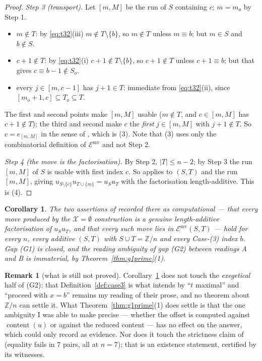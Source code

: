 \documentclass[11pt]{article}
\newtheorem{cor}[thm]{Corollary}
\theoremstyle{definition}
\newtheorem{rem}[thm]{Remark}
\newcommand{\Z}{\mathbb{Z}}
\newcommand{\XX}{\mathcal{X}}
\newcommand{\cont}{\operatorname{content}}
\begin{document}
\begin{proof}
\emph{Step 3 (transport).} Let $[m,M]$ be the run of $S$ containing $c$; $m=m_o$ by Step 1.
\begin{itemize}
\item $m\notin T$: by \eqref{eq:t32}(iii) $m\notin T\setminus\{b\}$, so $m\notin T$ unless
$m\equiv b$; but $m\in S$ and $b\notin S$.
\item $c+1\notin T$: by \eqref{eq:t32}(i) $c+1\notin T\setminus\{b\}$, so $c+1\notin T$ unless
$c+1\equiv b$; but that gives $c\equiv b-1\notin S_o$.
\item every $j\in[m,c-1]$ has $j+1\in T$: immediate from \eqref{eq:t32}(ii), since
$[m_o+1,c]\subseteq T_o\subseteq T$.
\end{itemize}
The first and second points make $[m,M]$ usable ($m\notin T$, and $c\in[m,M]$ has $c+1\notin T$);
the third and second make $c$ the \emph{first} $j\in[m,M]$ with $j+1\notin T$. So $c=e_{[m,M]}$
in the sense of \cite[Def.~1.1]{Clio3}, which is (3). Note that (3) uses only the combinatorial
definition of $\mathcal E^{\mathrm{mv}}$ and not Step 2.

\emph{Step 4 (the move is the factorisation).} By Step 2, $|T|\le n-2$; by Step 3 the run
$[m,M]$ of $S$ is usable with first index $c$. So \cite[Lem.~4.3]{Clio2} applies to $(S,T)$ and
the run $[m,M]$, giving $u_{S\setminus\{c\}}u_{T\cup\{m\}}=u_Su_T$ with the factorisation
length-additive. This is (4).
\end{proof}

\begin{cor}\label{cor:upgrade}
The two assertions of \cite[\S5]{Clio3} recorded there as computational --- that every move
produced by the $\XX=\emptyset$ construction is a genuine length-additive factorisation of
$u_Su_T$, and that every such move lies in $\mathcal E^{\mathrm{mv}}(S,T)$ --- hold for every
$n$, every additive $(S,T)$ with $S\cup T=\Z/n$ and every Case-(3) index $b$. Gap (G1) is
closed, and the reading ambiguity of gap (G2) between readings A and B is immaterial, by
Theorem~\ref{thm:g1prime}(1).
\end{cor}

\begin{rem}[what is still not proved]
Corollary~\ref{cor:upgrade} does not touch the \emph{exegetical} half of (G2): that
Definition~\ref{def:case3} is what \cite[\S\texttt{two factor case}]{MS} intends by ``$t$
maximal'' and ``proceed with $x=b$'' remains my reading of their prose, and no theorem about
$\Z/n$ can settle it. What Theorem~\ref{thm:g1prime}(1) does settle is that the one ambiguity I
was able to make precise --- whether the offset is computed against $\cont(u)$ or against the
reduced content --- has no effect on the answer, which \cite[\S Gaps, (G2)]{Clio3} could only
record as evidence. Nor does it touch the strictness claim of \cite[\S5]{Clio3} (equality fails
in $7$ pairs, all at $n=7$); that is an existence statement, certified by its witnesses.
\end{rem}
\end{document}
